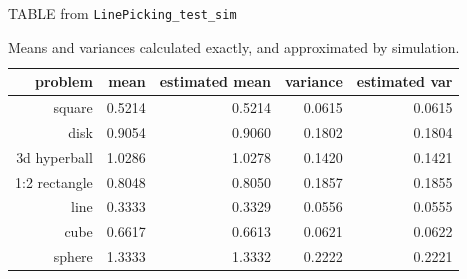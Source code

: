 TABLE from \verb|LinePicking_test_sim|

  \begin{table}[ht]
    \centering
    \begin{tabular}{r|rrrr}
             problem &     mean & estimated mean & variance &  estimated var \\
     \hline 
              square &   0.5214 &         0.5214 &   0.0615 &         0.0615 \\
                disk &   0.9054 &         0.9060 &   0.1802 &         0.1804 \\
        3d hyperball &   1.0286 &         1.0278 &   0.1420 &         0.1421 \\
       1:2 rectangle &   0.8048 &         0.8050 &   0.1857 &         0.1855 \\
                line &   0.3333 &         0.3329 &   0.0556 &         0.0555 \\
                cube &   0.6617 &         0.6613 &   0.0621 &         0.0622 \\
              sphere &   1.3333 &         1.3332 &   0.2222 &         0.2221 \\
    \end{tabular}
    \caption{Means and variances calculated exactly, and approximated by simulation.}
    \label{tab:mean_var_estimates}
  \end{table}
